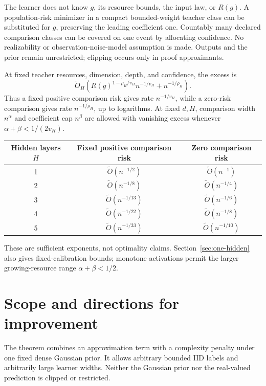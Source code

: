 \documentclass[11pt]{article}
\theoremstyle{remark}\newtheorem{remark}[theorem]{Remark}
\begin{document}
The learner does not know $g$, its resource bounds, the input law, or $R(g)$. A population-risk minimizer in a compact bounded-weight teacher class can be substituted for $g$, preserving the leading coefficient one. Countably many declared comparison classes can be covered on one event by allocating confidence. No realizability or observation-noise-model assumption is made. Outputs and the prior remain unrestricted; clipping occurs only in proof approximants.

\begin{corollary}
\label{cor:rates}
At fixed teacher resources, dimension, depth, and confidence, the excess is
\[
 \widetilde O_H\!\left(R(g)^{1-\rho_H/v_H}n^{-1/v_H}+n^{-1/\rho_H}\right).
\]
Thus a fixed positive comparison risk gives rate $n^{-1/v_H}$, while a zero-risk comparison gives rate $n^{-1/\rho_H}$, up to logarithms. At fixed $d,H$, comparison width $n^\alpha$ and coefficient cap $n^\beta$ are allowed with vanishing excess whenever $\alpha+\beta<1/(2v_H)$.
\end{corollary}

\begin{center}
\begin{tabular}{ccc}
\toprule
Hidden layers $H$ & Fixed positive comparison risk & Zero comparison risk\\
\midrule
1 & $\widetilde O(n^{-1/2})$ & $\widetilde O(n^{-1})$\\
2 & $\widetilde O(n^{-1/8})$ & $\widetilde O(n^{-1/4})$\\
3 & $\widetilde O(n^{-1/13})$ & $\widetilde O(n^{-1/6})$\\
4 & $\widetilde O(n^{-1/22})$ & $\widetilde O(n^{-1/8})$\\
5 & $\widetilde O(n^{-1/33})$ & $\widetilde O(n^{-1/10})$\\
\bottomrule
\end{tabular}
\end{center}
These are sufficient exponents, not optimality claims. Section~\ref{sec:one-hidden} also gives fixed-calibration bounds; monotone activations permit the larger growing-resource range $\alpha+\beta<1/2$.









\section{Scope and directions for improvement}
The theorem combines an approximation term with a complexity penalty under one fixed dense Gaussian prior. It allows arbitrary bounded IID labels and arbitrarily large learner widths. Neither the Gaussian prior nor the real-valued prediction is clipped or restricted.
\end{document}
